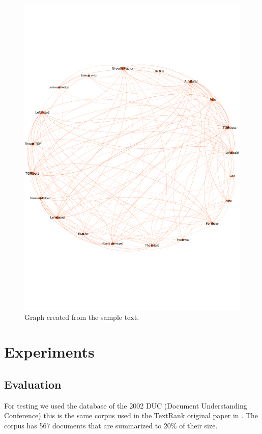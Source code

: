 \documentclass{llncs}
\begin{document}
\begin{figure}[h!]
    \centering
    \includegraphics[trim = 0mm 50mm 0mm 50mm, clip, scale=0.15,width=1\textwidth]{graph.pdf}
    \caption{Graph created from the sample text.}
\end{figure}


\section{Experiments}

\subsection{Evaluation}
For testing we used the database of the 2002 DUC (Document Understanding Conference) \cite{duc2002-guidelines} this is the same corpus used in the TextRank original paper in \cite{mihalcea-tarau}. The corpus has 567 documents that are summarized to 20\% of their size.
\end{document}
